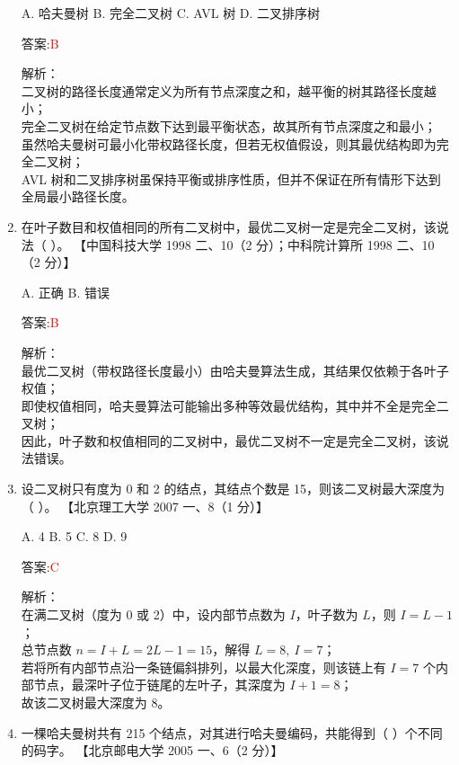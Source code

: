 \documentclass[lang=cn,newtx,10pt,scheme=chinese]{../../../elegantbook}
\begin{document}
\begin{enumerate}
    A. 哈夫曼树  
    B. 完全二叉树  
    C. AVL 树  
    D. 二叉排序树

    答案:\textcolor{red}{B}

    解析：\\
    二叉树的路径长度通常定义为所有节点深度之和，越平衡的树其路径长度越小；\\
    完全二叉树在给定节点数下达到最平衡状态，故其所有节点深度之和最小；\\
    虽然哈夫曼树可最小化带权路径长度，但若无权值假设，则其最优结构即为完全二叉树；\\
    AVL 树和二叉排序树虽保持平衡或排序性质，但并不保证在所有情形下达到全局最小路径长度。\\

\item 在叶子数目和权值相同的所有二叉树中，最优二叉树一定是完全二叉树，该说法（ ）。  
    【中国科技大学 1998 二、10（2 分）；中科院计算所 1998 二、10（2 分）】

    A. 正确  
    B. 错误

    答案:\textcolor{red}{B}

    解析：\\
    最优二叉树（带权路径长度最小）由哈夫曼算法生成，其结果仅依赖于各叶子权值；\\
    即使权值相同，哈夫曼算法可能输出多种等效最优结构，其中并不全是完全二叉树；\\
    因此，叶子数和权值相同的二叉树中，最优二叉树不一定是完全二叉树，该说法错误。\\

\item 设二叉树只有度为 0 和 2 的结点，其结点个数是 15，则该二叉树最大深度为（ ）。  
    【北京理工大学 2007 一、8（1 分）】

    A. 4  
    B. 5  
    C. 8  
    D. 9

    答案:\textcolor{red}{C}

    解析：\\
    在满二叉树（度为 0 或 2）中，设内部节点数为 $I$，叶子数为 $L$，则 $I = L - 1$；\\
    总节点数 $n = I + L = 2L - 1 = 15$，解得 $L = 8,\ I = 7$；\\
    若将所有内部节点沿一条链偏斜排列，以最大化深度，则该链上有 $I=7$ 个内部节点，最深叶子位于链尾的左叶子，其深度为 $I+1=8$；\\
    故该二叉树最大深度为 8。\\

\item 一棵哈夫曼树共有 215 个结点，对其进行哈夫曼编码，共能得到（ ）个不同的码字。  
    【北京邮电大学 2005 一、6（2 分）】


\end{enumerate}
\end{document}
